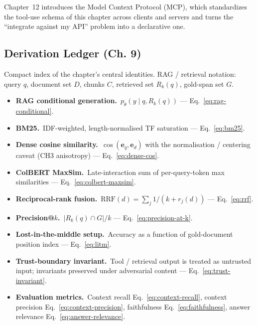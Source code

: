 Chapter~12 introduces the Model Context Protocol (MCP), which
standardizes the tool-use schema of this chapter across clients
and servers and turns the ``integrate against my API'' problem
into a declarative one.

\subsection*{Derivation Ledger (Ch. 9)}

\begin{derivledger}
Compact index of the chapter's central identities. RAG / retrieval
notation: query $q$, document set $D$, chunks $C$, retrieved set
$R_k(q)$, gold-span set $G$.
\begin{itemize}
  \item \textbf{RAG conditional generation.}\
        $p_\theta(y \mid q, R_k(q))$
        --- Eq.~\eqref{eq:rag-conditional}.
  \item \textbf{BM25.}\
        IDF-weighted, length-normalised TF saturation
        --- Eq.~\eqref{eq:bm25}.
  \item \textbf{Dense cosine similarity.}\
        $\cos(\mathbf{e}_q, \mathbf{e}_d)$ with the
        normalisation / centering caveat (CH3 anisotropy)
        --- Eq.~\eqref{eq:dense-cos}.
  \item \textbf{ColBERT MaxSim.}\
        Late-interaction sum of per-query-token max similarities
        --- Eq.~\eqref{eq:colbert-maxsim}.
  \item \textbf{Reciprocal-rank fusion.}\
        $\mathrm{RRF}(d) = \sum_{j} 1 / (k + r_j(d))$
        --- Eq.~\eqref{eq:rrf}.
  \item \textbf{Precision@$k$.}\
        $|R_k(q) \cap G| / k$
        --- Eq.~\eqref{eq:precision-at-k}.
  \item \textbf{Lost-in-the-middle setup.}\
        Accuracy as a function of gold-document position index
        --- Eq.~\eqref{eq:litm}.
  \item \textbf{Trust-boundary invariant.}\
        Tool / retrieval output is treated as untrusted input;
        invariants preserved under adversarial content
        --- Eq.~\eqref{eq:trust-invariant}.
  \item \textbf{Evaluation metrics.}\
        Context recall Eq.~\eqref{eq:context-recall},
        context precision Eq.~\eqref{eq:context-precision},
        faithfulness Eq.~\eqref{eq:faithfulness},
        answer relevance Eq.~\eqref{eq:answer-relevance}.
\end{itemize}
\end{derivledger}

